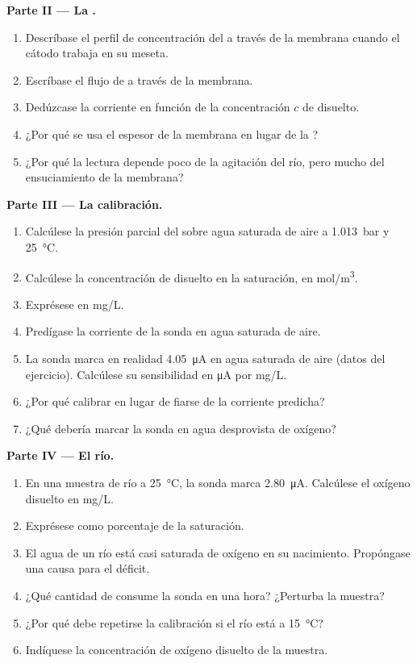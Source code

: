 \begin{problem}
\medskip
\noindent\textbf{Parte II --- La .}
\begin{enumerate}[resume]
  \item Descríbase el perfil de concentración del  a través de la membrana cuando el
        cátodo trabaja en su meseta.
  \item Escríbase el flujo de  a través de la membrana.
  \item Dedúzcase la corriente en función de la concentración $c$ de 
        disuelto.
  \item ¿Por qué se usa el espesor de la membrana en lugar de la ?
  \item ¿Por qué la lectura depende poco de la agitación del río, pero mucho
        del ensuciamiento de la membrana?
\end{enumerate}

\medskip
\noindent\textbf{Parte III --- La calibración.}
\begin{enumerate}[resume]
  \item Calcúlese la presión parcial del  sobre agua saturada de aire a
        \qty{1.013}{bar} y \qty{25}{\degreeCelsius}.
  \item Calcúlese la concentración de  disuelto en la saturación, en
        \unit{mol/m^3}.
  \item Exprésese en \unit{mg/L}.
  \item Predígase la corriente de la sonda en agua saturada de aire.
  \item La sonda marca en realidad \qty{4.05}{\micro A} en agua saturada de aire
        (datos del ejercicio). Calcúlese su sensibilidad en \unit{\micro A} por
        \unit{mg/L}.
  \item ¿Por qué calibrar en lugar de fiarse de la corriente predicha?
  \item ¿Qué debería marcar la sonda en agua desprovista de oxígeno?
\end{enumerate}

\medskip
\noindent\textbf{Parte IV --- El río.}
\begin{enumerate}[resume]
  \item En una muestra de río a \qty{25}{\degreeCelsius}, la sonda marca
        \qty{2.80}{\micro A}. Calcúlese el oxígeno disuelto en \unit{mg/L}.
  \item Exprésese como porcentaje de la saturación.
  \item El agua de un río está casi saturada de oxígeno en su nacimiento.
        Propóngase una causa para el déficit.
  \item ¿Qué cantidad de  consume la sonda en una hora? ¿Perturba la
        muestra?
  \item ¿Por qué debe repetirse la calibración si el río está a
        \qty{15}{\degreeCelsius}?
  \item Indíquese la concentración de oxígeno disuelto de la muestra.
\end{enumerate}
\end{problem}
